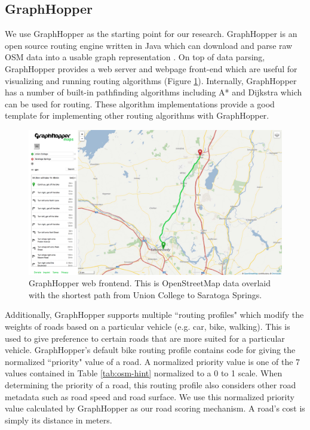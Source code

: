 \documentclass[honors]{union-cs-thesis}
\begin{document}
\subsection{GraphHopper}
\label{sec:graphhopper}
We use GraphHopper as the starting point for our research. GraphHopper is an open source routing engine written in Java which can download and parse raw OSM data into a usable graph representation \cite{graphhopper}. On top of data parsing, GraphHopper provides a web server and webpage front-end which are useful for visualizing and running routing algorithms (Figure \ref{tab:graphhopper-frontend}). Internally, GraphHopper has a number of built-in pathfinding algorithms including A* and Dijkstra which can be used for routing. These algorithm implementations provide a good template for implementing other routing algorithms with GraphHopper. 

\begin{figure}[h]
    \begin{center}
        \includegraphics[width=\textwidth]{figs/graphhopper}
    \end{center}
    \caption{GraphHopper web frontend. This is OpenStreetMap data overlaid with the shortest path from Union College to Saratoga Springs.}
    \label{tab:graphhopper-frontend}
\end{figure}

Additionally, GraphHopper supports multiple ``routing profiles" which modify the weights of roads based on a particular vehicle (e.g. car, bike, walking). This is used to give preference to certain roads that are more suited for a particular vehicle. GraphHopper's default bike routing profile contains code for giving the normalized ``priority" value of a road. A normalized priority value is one of the 7 values contained in Table \ref{tab:osm-hint} normalized to a 0 to 1 scale. When determining the priority of a road, this routing profile also considers other road metadata such as road speed and road surface. We use this normalized priority value calculated by GraphHopper as our road scoring mechanism. A road's cost is simply its distance in meters.
\end{document}
